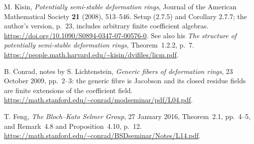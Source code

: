 M. Kisin, \emph{Potentially semi-stable deformation rings},
Journal of the American Mathematical Society \textbf{21} (2008),
513--546.  Setup (2.7.5) and Corollary 2.7.7; the author's
version, p.~23, includes arbitrary finite coefficient algebras.
\url{https://doi.org/10.1090/S0894-0347-07-00576-0}.
See also his \emph{The structure of potentially semi-stable
deformation rings}, Theorem~1.2.2, p.~7.
\url{https://people.math.harvard.edu/~kisin/dvifiles/licm.pdf}.

B. Conrad, notes by S. Lichtenstein,
\emph{Generic fibers of deformation rings}, 23 October 2009,
pp.~2--3: the generic fibre is Jacobson and its closed residue
fields are finite extensions of the coefficient field.
\url{https://math.stanford.edu/~conrad/modseminar/pdf/L04.pdf}.

T. Feng, \emph{The Bloch--Kato Selmer Group},
27 January 2016, Theorem~2.1, pp.~4--5, and
Remark~4.8 and Proposition~4.10, p.~12.
\url{https://math.stanford.edu/~conrad/BSDseminar/Notes/L14.pdf}.
